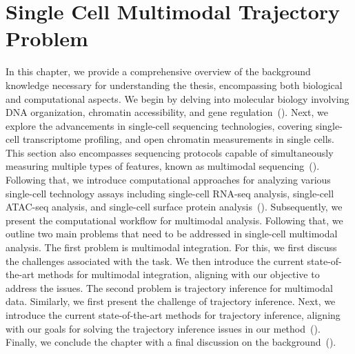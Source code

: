 %
%
\chapter{Single Cell Multimodal Trajectory Problem}
\label{chapter:problem_TI}
\graphicspath{{chapter6/figs/}}

In this chapter, we provide a comprehensive overview of the background knowledge necessary for understanding the thesis, encompassing both biological and computational aspects. We begin by delving into molecular biology involving DNA organization, chromatin accessibility, and gene regulation~(). Next, we explore the advancements in single-cell sequencing technologies, covering single-cell transcriptome profiling, and open chromatin measurements in single cells. This section also encompasses sequencing protocols capable of simultaneously measuring multiple types of features, known as multimodal sequencing~(). Following that, we introduce computational approaches for analyzing various single-cell technology assays including single-cell RNA-seq analysis, single-cell ATAC-seq analysis, and single-cell surface protein analysis~(). Subsequently, we present the computational workflow for multimodal analysis. Following that, we outline two main problems that need to be addressed in single-cell multimodal analysis. The first problem is multimodal integration. For this, we first discuss the challenges associated with the task. We then introduce the current state-of-the-art methods for multimodal integration, aligning with our objective to address the issues. The second problem is trajectory inference for multimodal data. Similarly, we first present the challenge of trajectory inference. Next, we introduce the current state-of-the-art methods for trajectory inference, aligning with our goals for solving the trajectory inference issues in our method~(). Finally, we conclude the chapter with a final discussion on the background~().




